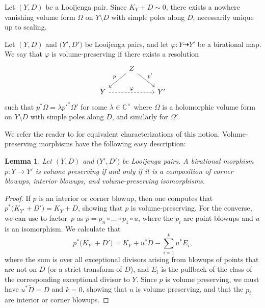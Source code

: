 \documentclass[pdftex]{sigma}
\numberwithin{equation}{section}
\newtheorem{Lemma}[Theorem]{Lemma}
\newcommand{\CC}{\mathbb{C}}
\begin{document}
 Let $(Y, D)$ be a Looijenga pair. Since $K_Y+D \sim 0$, there exists a nowhere vanishing volume form $\Omega$ on $Y \setminus D$ with simple poles along $D$, necessarily unique up to scaling.
	\begin{Definition}
		Let $(Y, D)$ and $\bigl(Y', D'\bigr)$ be Looijenga pairs, and let $\varphi \colon Y \dashrightarrow Y'$ be a birational map.
		We say that $\varphi$ is volume-preserving if there exists a resolution
		\[
		\begin{tikzcd}
			&Z \ar[dl, swap, "p"] \ar[dr, "p'"]&\\
			Y \ar[rr, dashed, "\varphi"]&&Y'
		\end{tikzcd}
	\]
		such that $p^*\Omega = \lambda p'^*\Omega'$ for some
		$\lambda \in \CC^\times$ where $\Omega$ is a holomorphic volume form on $Y \setminus D$ with simple poles along $D$, and similarly for $\Omega'$.
	\end{Definition}
We refer the reader to \cite[Remark 1.7]{CortiKaloghiros} for equivalent characterizations of this notion.
Volume-preserving morphisms have the following easy description:
\begin{Lemma}\label{lem:volume-preserving}
	Let $(Y, D)$ and $\bigl(Y', D'\bigr)$ be Looijenga pairs. A birational morphism $p \colon Y \rightarrow Y'$ is volume preserving if and only if it is a composition of corner blowups, interior blowups, and volume-preserving isomorphisms.
\end{Lemma}
\begin{proof}
	If $p$ is an interior or corner blowup, then one computes that ${p^*\bigl(K_{Y'}+D'\bigr)=K_Y+D}$, showing that $p$ is volume-preserving. For the converse, we can use \cite[Theorem 1.3.5]{Alberich} to factor~$p$ as
$
	p=p_n \circ \dots \circ p_1 \circ u$,
	where the $p_i$ are point blowups and $u$ is an isomorphism. We calculate that
	\[
	p^*\bigl(K_{Y'}+D'\bigr)=K_{Y}+u^*\tilde{D}-\sum_{i=1}^k u^*E_i,
	\]
	where the sum is over all exceptional divisors arising from blowups of points that are not on $D$ (or a strict transform of $D$), and $E_i$ is the pullback of the class of the corresponding exceptional divisor to $Y$.
	Since $p$ is volume preserving, we must have $u^*\tilde{D}=D$ and $k=0$, showing that $u$ is volume preserving, and that the $p_i$ are interior or corner blowups.
\end{proof}
\end{document}
